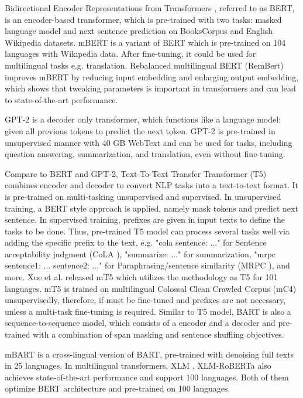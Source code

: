 Bidirectional Encoder Representations from Transformers \cite{BERT}, 
referred to as BERT, is an encoder-based transformer, 
which is pre-trained with two tasks: masked language model 
and next sentence prediction on BooksCorpus \cite{DBLP:journals/corr/ZhuKZSUTF15} and English Wikipedia datasets. 
mBERT \cite{mBERT} is a variant of BERT which is pre-trained on 104 languages with Wikipedia data. 
After fine-tuning, it could be used for multilingual tasks e.g. translation. 
Rebalanced multilingual BERT (RemBert) \cite{RemBert} improves mBERT by reducing input embedding and enlarging output embedding, 
which shows that tweaking parameters is important in transformers and can lead to state-of-the-art performance. 

GPT-2 \cite{radford2019language} is a decoder only transformer, 
which functions like a language model: given all previous tokens to predict the next token. 
GPT-2 is pre-trained in unsupervised manner with 40 GB WebText and can be used for tasks, 
including question answering, summarization, and translation, even without fine-tuning. 

Compare to BERT and GPT-2, 
Text-To-Text Transfer Transformer (T5) \cite{DBLP:journals/corr/abs-1910-10683} combines 
encoder and decoder to convert NLP tasks into a text-to-text format. 
It is pre-trained on multi-tasking unsupervised and supervised. 
In unsupervised training, a BERT style approach is applied, namely mask tokens and predict next sentence. 
In supervised training, prefixes are given in input texts to define the tasks to be done. 
Thus, pre-trained T5 model can process several tasks well via adding the specific prefix to the text, 
e.g. "cola sentence: ..." for Sentence acceptability judgment (CoLA \cite{DBLP:journals/corr/abs-1805-12471}), 
"summarize: ..." for summarization, 
"mrpc sentence1: ... sentence2: ..." for Paraphrasing/sentence similarity (MRPC \cite{dolan-brockett-2005-automatically}), and more. 
Xue et al. \cite{DBLP:journals/corr/abs-2010-11934} released mT5 which utilizes the methodology as T5 for 101 languages. 
mT5 is trained on multilingual Colossal Clean Crawled Corpus (mC4) unsupervisedly, 
therefore, if must be fine-tuned and prefixes are not necessary, unless a multi-task fine-tuning is required. 
Similar to T5 model, BART \cite{DBLP:journals/corr/abs-1910-13461} is also a sequence-to-sequence model, 
which consists of a encoder and a decoder and pre-trained with a combination of span masking and sentence shuffling objectives. 

mBART \cite{DBLP:journals/corr/abs-2001-08210} is a cross-lingual version of BART, 
pre-trained with denoising full texts in 25 languages. 
In multilingual transformers, XLM \cite{DBLP:journals/corr/abs-1901-07291}, 
XLM-RoBERTa \cite{DBLP:journals/corr/abs-1911-02116} also achieves state-of-the-art performance and support 100 languages. 
Both of them optimize BERT architecture and pre-trained on 100 languages. 

